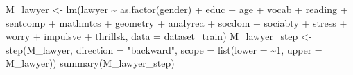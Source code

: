 \documentclass[
]{article}
\newenvironment{Shaded}{\begin{snugshade}}{\end{snugshade}}
\newcommand{\AttributeTok}[1]{\textcolor[rgb]{0.77,0.63,0.00}{#1}}
\newcommand{\CommentTok}[1]{\textcolor[rgb]{0.56,0.35,0.01}{\textit{#1}}}
\newcommand{\DecValTok}[1]{\textcolor[rgb]{0.00,0.00,0.81}{#1}}
\newcommand{\FunctionTok}[1]{\textcolor[rgb]{0.00,0.00,0.00}{#1}}
\newcommand{\NormalTok}[1]{#1}
\newcommand{\OtherTok}[1]{\textcolor[rgb]{0.56,0.35,0.01}{#1}}
\newcommand{\SpecialCharTok}[1]{\textcolor[rgb]{0.00,0.00,0.00}{#1}}
\newcommand{\StringTok}[1]{\textcolor[rgb]{0.31,0.60,0.02}{#1}}
\begin{document}
\begin{Shaded}
\end{Shaded}

\begin{Shaded}
\begin{Highlighting}[]
\NormalTok{M\_lawyer }\OtherTok{\textless{}{-}} \FunctionTok{lm}\NormalTok{(lawyer }\SpecialCharTok{\textasciitilde{}} \FunctionTok{as.factor}\NormalTok{(gender) }\SpecialCharTok{+}\NormalTok{ educ }\SpecialCharTok{+}\NormalTok{ age }\SpecialCharTok{+}\NormalTok{ vocab }\SpecialCharTok{+}
\NormalTok{    reading }\SpecialCharTok{+}\NormalTok{ sentcomp }\SpecialCharTok{+}\NormalTok{ mathmtcs }\SpecialCharTok{+}\NormalTok{ geometry }\SpecialCharTok{+}\NormalTok{ analyrea }\SpecialCharTok{+}\NormalTok{ socdom }\SpecialCharTok{+}
\NormalTok{    sociabty }\SpecialCharTok{+}\NormalTok{ stress }\SpecialCharTok{+}\NormalTok{ worry }\SpecialCharTok{+}\NormalTok{ impulsve }\SpecialCharTok{+}\NormalTok{ thrillsk, }\AttributeTok{data =}\NormalTok{ dataset\_train)}
\NormalTok{M\_lawyer\_step }\OtherTok{\textless{}{-}} \FunctionTok{step}\NormalTok{(M\_lawyer, }\AttributeTok{direction =} \StringTok{"backward"}\NormalTok{, }\AttributeTok{scope =} \FunctionTok{list}\NormalTok{(}\AttributeTok{lower =} \SpecialCharTok{\textasciitilde{}}\DecValTok{1}\NormalTok{,}
    \AttributeTok{upper =}\NormalTok{ M\_lawyer))}
\FunctionTok{summary}\NormalTok{(M\_lawyer\_step)}
\end{Highlighting}
\end{Shaded}
\end{document}
